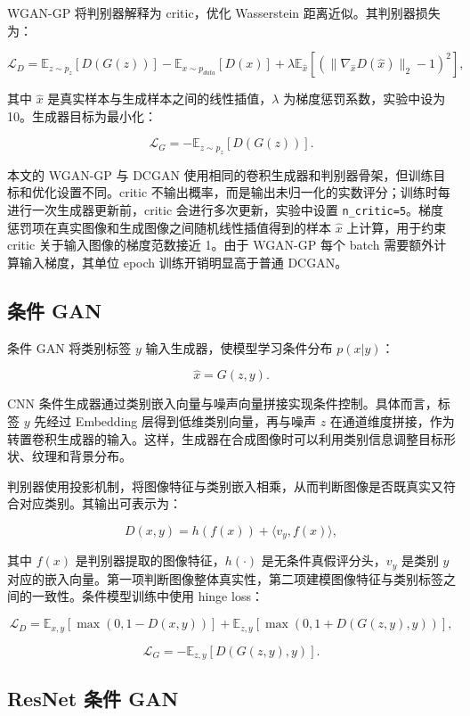 \documentclass[UTF8,a4paper,12pt]{ctexart}
\begin{document}
WGAN-GP 将判别器解释为 critic，优化 Wasserstein 距离近似。其判别器损失为：


$$
\mathcal{L}_D =
\mathbb{E}_{z \sim p_z}[D(G(z))]
-\mathbb{E}_{x \sim p_{data}}[D(x)]
+ \lambda \mathbb{E}_{\hat{x}}[(\|\nabla_{\hat{x}}D(\hat{x})\|_2 - 1)^2],
$$


其中 $\hat{x}$ 是真实样本与生成样本之间的线性插值，$\lambda$ 为梯度惩罚系数，实验中设为 10。生成器目标为最小化：


$$
\mathcal{L}_G = -\mathbb{E}_{z \sim p_z}[D(G(z))].
$$


本文的 WGAN-GP 与 DCGAN 使用相同的卷积生成器和判别器骨架，但训练目标和优化设置不同。critic 不输出概率，而是输出未归一化的实数评分；训练时每进行一次生成器更新前，critic 会进行多次更新，实验中设置 \texttt{n\_critic=5}。梯度惩罚项在真实图像和生成图像之间随机线性插值得到的样本 $\hat{x}$ 上计算，用于约束 critic 关于输入图像的梯度范数接近 1。由于 WGAN-GP 每个 batch 需要额外计算输入梯度，其单位 epoch 训练开销明显高于普通 DCGAN。


\subsection{条件 GAN}

条件 GAN 将类别标签 $y$ 输入生成器，使模型学习条件分布 $p(x|y)$：


$$
\hat{x} = G(z, y).
$$


CNN 条件生成器通过类别嵌入向量与噪声向量拼接实现条件控制。具体而言，标签 $y$ 先经过 Embedding 层得到低维类别向量，再与噪声 $z$ 在通道维度拼接，作为转置卷积生成器的输入。这样，生成器在合成图像时可以利用类别信息调整目标形状、纹理和背景分布。


判别器使用投影机制，将图像特征与类别嵌入相乘，从而判断图像是否既真实又符合对应类别。其输出可表示为：


$$
D(x,y)=h(f(x))+\langle v_y, f(x)\rangle,
$$


其中 $f(x)$ 是判别器提取的图像特征，$h(\cdot)$ 是无条件真假评分头，$v_y$ 是类别 $y$ 对应的嵌入向量。第一项判断图像整体真实性，第二项建模图像特征与类别标签之间的一致性。条件模型训练中使用 hinge loss：


$$
\mathcal{L}_D =
\mathbb{E}_{x,y}[\max(0,1-D(x,y))]
+\mathbb{E}_{z,y}[\max(0,1+D(G(z,y),y))],
$$


$$
\mathcal{L}_G =
-\mathbb{E}_{z,y}[D(G(z,y),y)].
$$


\subsection{ResNet 条件 GAN}
\end{document}
